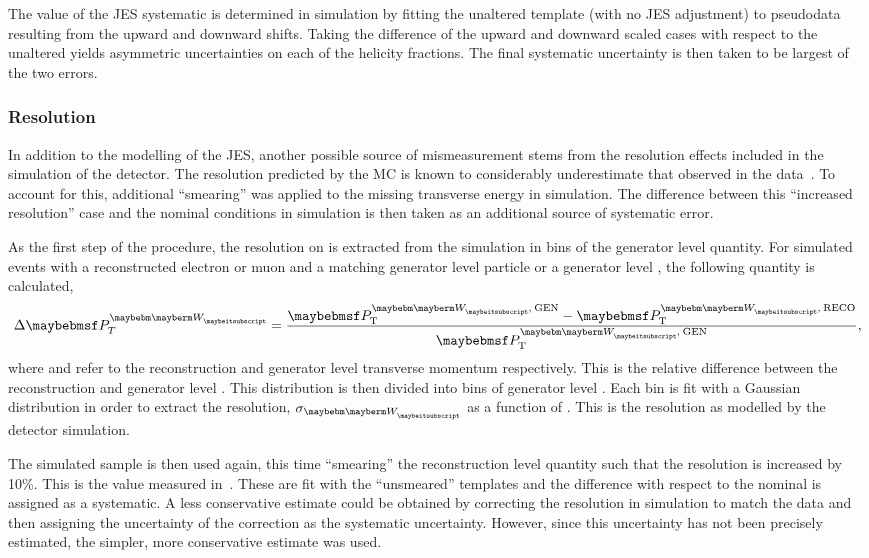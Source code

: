 The value of the \ac{JES} systematic is determined in simulation by
fitting the unaltered template (with no \ac{JES} adjustment) to
pseudodata resulting from the upward and downward shifts. Taking the difference
of the upward and downward scaled cases with respect to the unaltered yields
asymmetric uncertainties on each of the helicity fractions. The final systematic
uncertainty is then taken to be largest of the two errors.

\subsubsection{\MET Resolution}
In addition to the modelling of the \ac{JES}, another possible source of
mismeasurement stems from the resolution effects included in the simulation of
the detector. The resolution predicted by the \ac{MC} is known to
considerably underestimate that observed in the
data~\cite{cms_met_paper,cms_met_pas}. To account for this, additional
``smearing'' was applied to the missing transverse energy in simulation. The
difference between this ``increased resolution'' case and the nominal conditions
in simulation is then taken as an additional source of systematic error.

As the first step of the procedure, the resolution on \PtW is extracted from the
simulation in bins of the generator level \PtW quantity. For simulated \Wjets
events with a reconstructed electron or muon and a matching generator level
particle or a generator level \Ptau, the following quantity is calculated,
\begin{equation*}
\Delta\PtW = \frac{\PtWgen - \PtWreco}{\PtWgen},
\end{equation*}
where \PtWreco and \PtWgen refer to the reconstruction and generator level \PW
transverse momentum respectively. This is the relative difference between the
reconstruction and generator level \PtW. This distribution is then divided into
bins of generator level \PtW. Each bin is fit with a Gaussian distribution in
order to extract the resolution, $\sigma_{\PW}$ as a function of \PtW. This is
the \PtW resolution as modelled by the detector simulation.

The simulated sample is then used again, this time ``smearing'' the
reconstruction level \PtW quantity such that the resolution is increased by
10\%. This is the value measured in~\cite{cms_met_paper}. These are fit with the
``unsmeared'' templates and the difference with respect to the nominal is
assigned as a systematic. A less conservative estimate could be obtained by
correcting the resolution in simulation to match the data and then assigning the
uncertainty of the correction as the systematic uncertainty. However, since this
uncertainty has not been precisely estimated, the simpler, more conservative
estimate was used.

